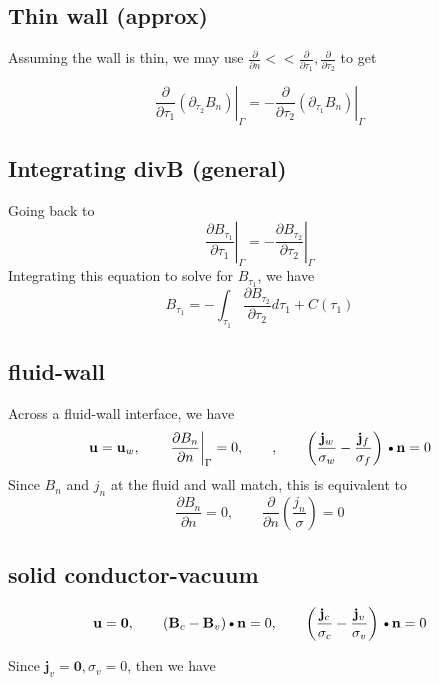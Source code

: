 \documentclass[11pt]{article}
\newcommand{\B}{\mathbf{B}}
\newcommand{\U}{\mathbf{u}}
\newcommand{\PD}{\partial}
\newcommand{\J}{\mathbf{j}}
\newcommand{\N}{\mathbf{n}}
\newcommand{\DOT}{\text{\textbullet}}
\begin{document}
\subsection{Thin wall (approx)}
Assuming the wall is thin, we may use $\frac{\PD}{\PD n} << \frac{\PD}{\PD \tau_1},\frac{\PD}{\PD \tau_2}$ to get

\begin{equation}
  \left. \frac{\PD }{\PD \tau_1} \left( 
  \PD_{\tau_2} B_{n}
  \right) \right|_{\Gamma} = -
  \left. \frac{\PD }{\PD \tau_2} \left( 
  \PD_{\tau_1} B_{n}
  \right) \right|_{\Gamma}
\end{equation}

\subsection{Integrating divB (general)}
Going back to
\begin{equation}
  \left. \frac{\PD B_{\tau_1}}{\PD \tau_1} \right|_{\Gamma} = - 
  \left. \frac{\PD B_{\tau_2}}{\PD \tau_2} \right|_{\Gamma}
\end{equation}
Integrating this equation to solve for $B_{\tau_1}$, we have
\begin{equation}
  B_{\tau_1} = 
  -\int_{\tau_1} \frac{\PD B_{\tau_2}}{\PD \tau_2} d{\tau_1} + C(\tau_1)
\end{equation}

\subsection{fluid-wall}
Across a fluid-wall interface, we have
\begin{equation}
  \U = \U_w
  , \qquad
  \left. \frac{\PD B_n}{\PD n} \right|_{\Gamma} = 0
  , \qquad
  , \qquad
  \left( \frac{\J_w}{\sigma_w} -\frac{\J_f}{\sigma_f} \right) \DOT \N = 0
\end{equation}
Since $B_n$ and $j_n$ at the fluid and wall match, this is equivalent to
\begin{equation}
  \frac{\PD B_n}{\PD n} = 0
  , \qquad
  \frac{\PD}{\PD n} \left( \frac{j_n}{\sigma} \right) = 0
\end{equation}


\subsection{solid conductor-vacuum}
\begin{equation}
  \U = \mathbf{0}
  , \qquad
  (\B_c -\B_v) \DOT \N = 0
  , \qquad
  \left( \frac{\J_c}{\sigma_c} -\frac{\J_v}{\sigma_v} \right) \DOT \N = 0
\end{equation}

Since $\J_v = \mathbf{0},\sigma_v = 0$, then we have
\end{document}
